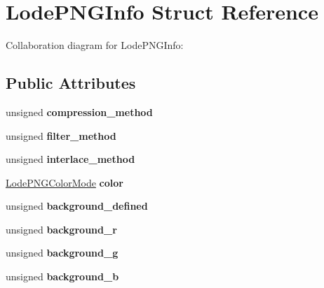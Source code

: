 \hypertarget{struct_lode_p_n_g_info}{}\section{Lode\+P\+N\+G\+Info Struct Reference}
\label{struct_lode_p_n_g_info}


Collaboration diagram for Lode\+P\+N\+G\+Info\+:
\subsection*{Public Attributes}
\begin{DoxyCompactItemize}
\item 
\mbox{\label{struct_lode_p_n_g_info_a42bcacd0dbaaea01c04cc87b58ac3c1d}} 
unsigned {\bfseries compression\+\_\+method}
\item 
\mbox{\label{struct_lode_p_n_g_info_a5098d6e8aa528d5197f51914439633b9}} 
unsigned {\bfseries filter\+\_\+method}
\item 
\mbox{\label{struct_lode_p_n_g_info_a80207e3e53c959b2285636496a3dd3f1}} 
unsigned {\bfseries interlace\+\_\+method}
\item 
\mbox{\label{struct_lode_p_n_g_info_a0af9bab3435084780ce8c1cb69bb2628}} 
\mbox{\hyperlink{struct_lode_p_n_g_color_mode}{Lode\+P\+N\+G\+Color\+Mode}} {\bfseries color}
\item 
\mbox{\label{struct_lode_p_n_g_info_aa94c65344af02472adb9c71eae2e765f}} 
unsigned {\bfseries background\+\_\+defined}
\item 
\mbox{\label{struct_lode_p_n_g_info_a98b59c3760bda184bb16c9713b430bc3}} 
unsigned {\bfseries background\+\_\+r}
\item 
\mbox{\label{struct_lode_p_n_g_info_abf638e191edaeaa2b02c371a381e3a89}} 
unsigned {\bfseries background\+\_\+g}
\item 
\mbox{\label{struct_lode_p_n_g_info_a994de0c74ef1092f056ff534e00dfa0d}} 
unsigned {\bfseries background\+\_\+b}
\item 

\end{DoxyCompactItemize}
